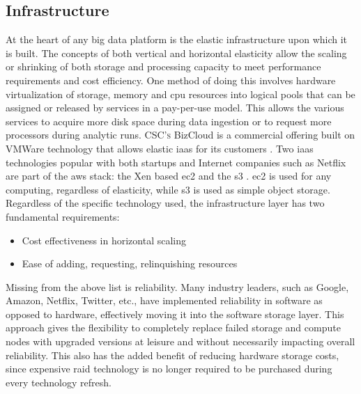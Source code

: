 \subsection{Infrastructure}
At the heart of any big data platform is the elastic infrastructure upon which it is built. The concepts of both vertical and horizontal elasticity allow the scaling or shrinking of both storage and processing capacity to meet performance requirements and cost efficiency. One method of doing this involves hardware virtualization  of storage, memory and \gls{cpu} resources into logical pools that can be assigned or released by services in a pay-per-use model. This allows the various services to acquire more disk space during data ingestion or to request more processors during analytic runs. \textsc{CSC's} BizCloud is a commercial offering built on VMWare  technology that allows elastic \gls{iaas} for its customers \cite{bizcloud}. Two \gls{iaas} technologies popular with both startups and Internet companies such as Netflix are part of the \gls{aws} stack: the Xen based \gls{ec2} and the \gls{s3} \cite{cockcroft}. \gls{ec2} is used for any computing, regardless of elasticity, while \gls{s3} is used as simple object storage. Regardless of the specific technology used, the infrastructure layer has two fundamental requirements:
\begin{itemize}
    \item Cost effectiveness in horizontal scaling
    \item Ease of adding, requesting, relinquishing resources
\end{itemize}
Missing from the above list is reliability. Many industry leaders, such as Google, Amazon, Netflix, Twitter, etc., have implemented reliability in software as opposed to hardware, effectively moving it into the software storage layer. This approach gives the flexibility to completely replace failed storage and compute nodes with upgraded versions at leisure and without necessarily impacting overall reliability. This also has the added benefit of  reducing hardware storage costs, since expensive \gls{raid} technology is no longer required to be purchased during every technology refresh.\\

